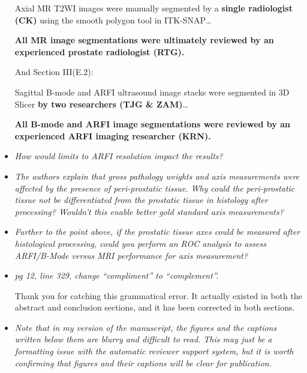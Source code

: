 \documentclass[10pt]{article}
\begin{document}
\begin{itemize}
    Axial MR T2WI images were manually segmented by a \textbf{single
        radiologist (CK)} using the smooth polygon tool in ITK-SNAP\ldots

    \textbf{All MR image segmentations were ultimately reviewed by an
        experienced prostate radiologist (RTG).}

    And Section III(E.2):

    Sagittal B-mode and ARFI ultrasound image stacks were segmented in 3D
    Slicer \textbf{by two researchers (TJG \& ZAM)}\ldots

    \textbf{All B-mode and ARFI image segmentations were reviewed by an
        experienced ARFI imaging researcher (KRN).}


    \item \textit{How would limits to ARFI resolution impact the results?}

    \item \textit{The authors explain that gross pathology weights and axis
            measurements were affected by the presence of peri-prostatic
            tissue.  Why could the peri-prostatic tissue not be differentiated
            from the prostatic tissue in histology after processing?  Wouldn't
            this enable better gold standard axis measurements?}

    \item \textit{Further to the point above, if the prostatic tissue axes
            could be measured after histological processing, could you perform
            an ROC analysis to assess ARFI/B-Mode versus MRI performance for
            axis measurement?}

    \item \textit{pg 12, line 329, change ``compliment'' to ``complement''.}

    Thank you for catching this grammatical error.  It actually existed in both
    the abstract and conclusion sections, and it has been corrected in both
    sections.

    \item \textit{Note that in my version of the manuscript, the figures and
            the captions written below them are blurry and difficult to read.
            This may just be a formatting issue with the automatic reviewer
            support system, but it is worth confirming that figures and their
            captions will be clear for publication.}

\end{itemize}
\end{document}
